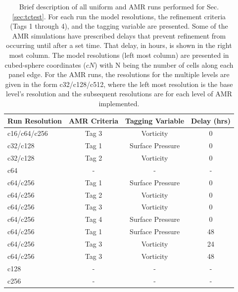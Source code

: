 \begin{table}[h]
  \caption{Brief description of all uniform and AMR runs performed for Sec. \ref{sec:tctest}.
  For each run the model resolutions, the refinement criteria (Tags 1 through 4), and the tagging variable are presented.
  Some of the AMR simulations have prescribed delays that prevent refinement from occurring until
  after a set time. That delay, in hours, is shown in the right most column. 
  The model resolutions (left most column) are presented in cubed-sphere coordinates ($cN$) with N
  being the number of cells along each panel edge.
  For the AMR runs, the resolutions for the multiple levels are given in the form c32/c128/c512, where the
  left most resolution is the base level's resolution and the subsequent 
  resolutions are for each level of AMR implemented.
  }
  \label{tb:tcruns}
  \begin{center}
  \begin{tabular}{lccc}
     \hline
     Run Resolution & AMR Criteria & Tagging Variable & Delay (hrs) \\
     \hline
     \hline
     c16/c64/c256 	& Tag 3	& Vorticity			& 0 \\
     c32/c128		& Tag 1	& Surface Pressure	& 0 \\
     c32/c128		& Tag 2	& Vorticity			& 0 \\
     c64			& - 		& - 				& - \\
     c64/c256		& Tag 1	& Surface Pressure	& 0 \\
     c64/c256		& Tag 2	& Vorticity			& 0 \\
     c64/c256		& Tag 3	& Vorticity			& 0 \\
     c64/c256		& Tag 4	& Surface Pressure	& 0 \\
     c64/c256		& Tag 1	& Surface Pressure	& 48 \\
     c64/c256		& Tag 3	& Vorticity			& 24 \\
     c64/c256		& Tag 3	& Vorticity			& 48 \\
     c128			& -		& -				& - \\
     c256			& -		& -				& - \\
     \hline
  \end{tabular}
  \end{center}
\end{table}

